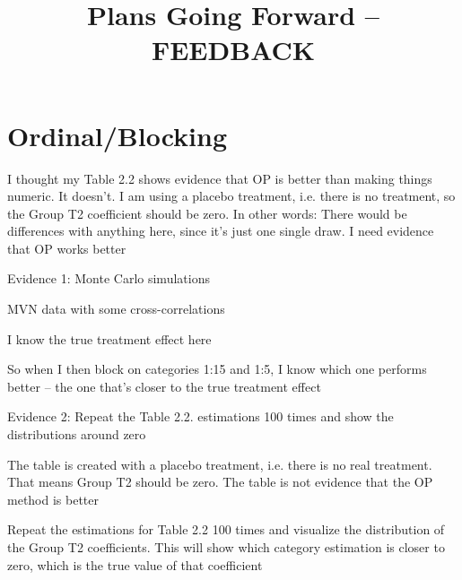 

\title{Plans Going Forward -- FEEDBACK}

\date{}



\maketitle

\vspace{-1.6cm}

\section*{Ordinal/Blocking}
	\begin{coi}
		\item I thought my Table 2.2 shows evidence that OP is better than making things numeric. It doesn't. I am using a placebo treatment, i.e. there is no treatment, so the Group T2 coefficient should be zero. In other words: There would be differences with anything here, since it's just one single draw. I need evidence that OP works better
			\begin{coi}
				\item Evidence 1: Monte Carlo simulations
					\begin{coi}
						\item MVN data with some cross-correlations
						\item I know the true treatment effect here
						\item So when I then block on categories 1:15 and 1:5, I know which one performs better -- the one that's closer to the true treatment effect
					\end{coi}
				\item Evidence 2: Repeat the Table 2.2. estimations 100 times and show the distributions around zero
					\begin{coi}
						\item The table is created with a placebo treatment, i.e. there is no real treatment. That means Group T2 should be zero. The table is not evidence that the OP method is better
						\item Repeat the estimations for Table 2.2 100 times and visualize the distribution of the Group T2 coefficients. This will show which category estimation is closer to zero, which is the true value of that coefficient
					\end{coi} 
			\end{coi}

\end{coi}
